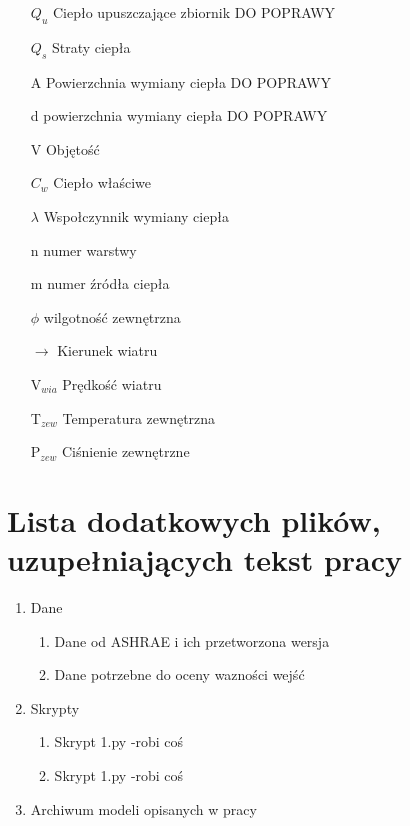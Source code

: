 \documentclass[a4paper,twoside,12pt]{book}
\begin{document}
\begin{appendices}
\begin{itemize}
		\item[$Q_u$] Ciepło upuszczające zbiornik DO POPRAWY
		\item[$Q_s$] Straty ciepła
		\item[A] Powierzchnia wymiany ciepła DO POPRAWY
		\item[d] powierzchnia wymiany ciepła DO POPRAWY
		\item[V] Objętość
		\item[$C_w$] Ciepło właściwe
		\item[$\lambda$] Wspołczynnik wymiany ciepła
		\item[n] numer warstwy
		\item[m] numer źródła ciepła
		\item[$\phi$] wilgotność zewnętrzna
		\item[$\longrightarrow$] Kierunek wiatru
		\item[V$_{wia}$] Prędkość wiatru
		\item[T$_{zew}$] Temperatura zewnętrzna
		\item[P$_{zew}$] Ciśnienie zewnętrzne
	\end{itemize}



	\chapter{Lista dodatkowych plików, uzupełniających tekst pracy}

	\begin{enumerate}
		\item Dane
		      \begin{enumerate}
			      \item Dane od ASHRAE i ich przetworzona wersja
			      \item Dane potrzebne do oceny wazności wejść
		      \end{enumerate}
		\item Skrypty
		      \begin{enumerate}
			      \item Skrypt 1.py -robi coś
			      \item Skrypt 1.py -robi coś
		      \end{enumerate}
		\item Archiwum modeli opisanych w pracy
	\end{enumerate}



	\listoffigures
	\listoftables

\end{appendices}
\end{document}
